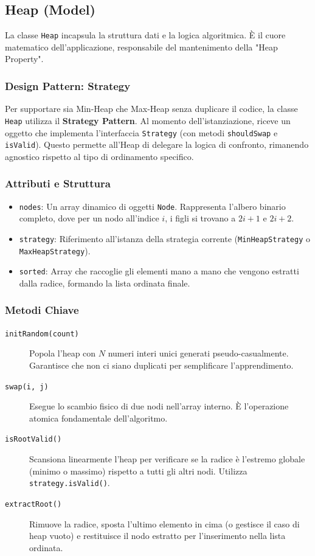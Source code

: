 \documentclass[openany]{theme/uniprthesis}
\begin{document}
\subsection{Heap (Model)}
La classe \texttt{Heap} incapsula la struttura dati e la logica algoritmica. È il cuore matematico dell'applicazione, responsabile del mantenimento della "Heap Property".

\subsubsection*{Design Pattern: Strategy}
Per supportare sia Min-Heap che Max-Heap senza duplicare il codice, la classe \texttt{Heap} utilizza il \textbf{Strategy Pattern}. Al momento dell'istanziazione, riceve un oggetto che implementa l'interfaccia \texttt{Strategy} (con metodi \texttt{shouldSwap} e \texttt{isValid}). Questo permette all'Heap di delegare la logica di confronto, rimanendo agnostico rispetto al tipo di ordinamento specifico.

\subsubsection*{Attributi e Struttura}
\begin{itemize}
    \item \texttt{nodes}: Un array dinamico di oggetti \texttt{Node}. Rappresenta l'albero binario completo, dove per un nodo all'indice $i$, i figli si trovano a $2i+1$ e $2i+2$.
    \item \texttt{strategy}: Riferimento all'istanza della strategia corrente (\texttt{MinHeapStrategy} o \texttt{MaxHeapStrategy}).
    \item \texttt{sorted}: Array che raccoglie gli elementi mano a mano che vengono estratti dalla radice, formando la lista ordinata finale.
\end{itemize}

\subsubsection*{Metodi Chiave}
\begin{description}
    \item[\texttt{initRandom(count)}] Popola l'heap con $N$ numeri interi unici generati pseudo-casualmente. Garantisce che non ci siano duplicati per semplificare l'apprendimento.
    \item[\texttt{swap(i, j)}] Esegue lo scambio fisico di due nodi nell'array interno. È l'operazione atomica fondamentale dell'algoritmo.
    \item[\texttt{isRootValid()}] Scansiona linearmente l'heap per verificare se la radice è l'estremo globale (minimo o massimo) rispetto a tutti gli altri nodi. Utilizza \texttt{strategy.isValid()}.
    \item[\texttt{extractRoot()}] Rimuove la radice, sposta l'ultimo elemento in cima (o gestisce il caso di heap vuoto) e restituisce il nodo estratto per l'inserimento nella lista ordinata.
\end{description}
\end{document}
